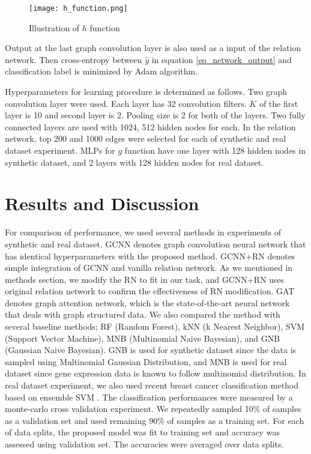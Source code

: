 \documentclass{article}
\begin{document}
\begin{figure}[!t]
\centering
\texttt{[image: h\_function.png]}
\caption{Illustration of $h$ function}
\label{fig_h}
\end{figure}

Output at the last graph convolution layer is also used as a input of the relation network. 
Then cross-entropy between $\hat{y}$ in equation \ref{eq_network_output} and classification label is minimized by Adam \cite{kingma2014adam} algorithm.


Hyperparameters for learning procedure is determined as follows. Two graph convolution layer were used. Each layer has 32 convolution filters. $K$ of the first layer is 10 and second layer is 2. Pooling size is 2 for both of the layers. Two fully connected layers are used with 1024, 512 hidden nodes for each.
In the relation network, top 200 and 1000 edges were selected for each of synthetic and real dataset experiment. MLPs for $g$ function have one layer with 128 hidden nodes in synthetic dataset, and 2 layers with 128 hidden nodes for real dataset.


\section{Results and Discussion}

For comparison of performance, we used several methods in experiments of synthetic and real dataset.
GCNN denotes graph convolution neural network that has identical hyperparameters with the proposed method. GCNN+RN denotes simple integration of GCNN and vanilla relation network. As we mentioned in methods section, we modify the RN to fit in our task, and GCNN+RN uses original relation network to confirm the effectiveness of RN modification. GAT denotes graph attention network, which is the state-of-the-art neural network that deals with graph structured data. We also compared the method with several baseline methods; RF (Random Forest), kNN (k Nearest Neighbor), SVM (Support Vector Machine), MNB (Multinomial Naive Bayesian), and GNB (Gaussian Naive Bayesian). GNB is used for synthetic dataset since the data is sampled using Multinomial Gaussian Distribution, and MNB is used for real dataset since gene expression data is known to follow multinomial distribution. In real dataset experiment, we also used recent breast cancer classification method based on ensemble SVM \cite{huang2017svm}. 
The classification performances were measured by a monte-carlo cross validation experiment. We repeatedly sampled 10\% of samples as a validation set and used remaining 90\% of samples as a training set. For each of data splits, the proposed
model was fit to training set and accuracy was assessed using validation set. The accuracies were averaged over data splits.
\end{document}
